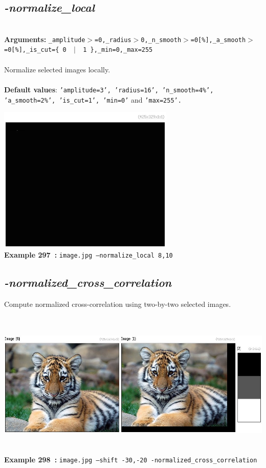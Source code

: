 \documentclass[a4paper,11pt,twoside]{book}
\begin{document}
\subsection{\emph{-normalize\_local} }\vspace*{-0.5em}
~\\\textbf{Arguments: } 
{\small \texttt{\_amplitude$>$=0,\_radius$>$0,\_n\_smooth$>$=0[\%],\_a\_smooth$>$=0[\%],\_is\_cut=\{ 0 ~$|$~ 1 \},\_min=0,\_max=255}}\\~\\
Normalize selected images locally.
~\\~\\\textbf{Default values}: {\small \texttt{'amplitude=3', 'radius=16', 'n\_smooth=4\%', 'a\_smooth=2\%', 'is\_cut=1', 'min=0'} and \texttt{'max=255'.}}
\begin{center}\includegraphics[keepaspectratio=true,height=7cm,width=\textwidth]{img/gmic_def297.jpg}\\
{\footnotesize \textbf{Example 297~:} \texttt{image.jpg --normalize\_local 8,10}}
\end{center}

\subsection{\emph{-normalized\_cross\_correlation} }\vspace*{-0.5em}
Compute normalized cross-correlation using two-by-two selected images.
\begin{center}\includegraphics[keepaspectratio=true,height=7cm,width=\textwidth]{img/gmic_def298.jpg}\\
{\footnotesize \textbf{Example 298~:} \texttt{image.jpg --shift -30,-20 -normalized\_cross\_correlation}}
\end{center}
\end{document}
